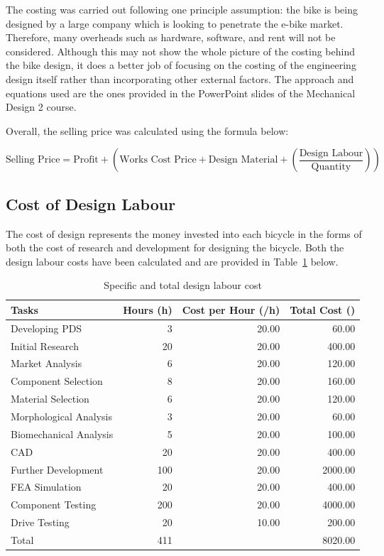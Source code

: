 \documentclass[a4paper,11pt]{article}
\begin{document}
The costing was carried out following one principle assumption: the bike is being designed by a large company which is looking to penetrate the e-bike market. Therefore, many overheads such as hardware, software, and rent will not be considered. Although this may not show the whole picture of the costing behind the bike design, it does a better job of focusing on the costing of the engineering design itself rather than incorporating other external factors. The approach and equations used are the ones provided in the PowerPoint slides of the Mechanical Design 2 course.

Overall, the selling price was calculated using the formula below: 

\[
	\text{Selling Price} = \text{Profit} + \left(\text{Works Cost Price} + \text{Design Material} + \left(\frac{\text{Design Labour}}{\text{Quantity}}\right)\right)
\]

\subsection{Cost of Design Labour}

The cost of design represents the money invested into each bicycle in the forms of both the cost of research and development for designing the bicycle. Both the design labour costs have been calculated and are provided in Table~\ref{tab:labco} below.  

\begin{table}[!ht]
	\centering
	\caption{Specific and total design labour cost}
	\begin{tabular}{l r r r}
		\hline
		\multicolumn{1}{l}{Tasks}&\multicolumn{1}{l}{Hours (h)}&\multicolumn{1}{l}{Cost per Hour (\textsterling/h)}&\multicolumn{1}{l}{Total Cost (\textsterling)}\\\hline
		Developing PDS	&3&20.00&60.00\\
		Initial Research&20&20.00&400.00\\
		Market Analysis&6&20.00&120.00\\
		Component Selection&8&20.00&160.00\\
		Material Selection&6&20.00&120.00\\
		Morphological Analysis&3&20.00&60.00\\
		Biomechanical Analysis&5&20.00&100.00\\
		CAD&20&20.00&400.00\\
		Further Development&100&20.00&2000.00\\
		FEA Simulation&20&20.00&400.00\\
		Component Testing&200&20.00&4000.00\\
		Drive Testing&20&10.00&200.00\\\hline
		Total&411&&8020.00\\\hline
	\end{tabular}
	\label{tab:labco}
\end{table}
\end{document}

